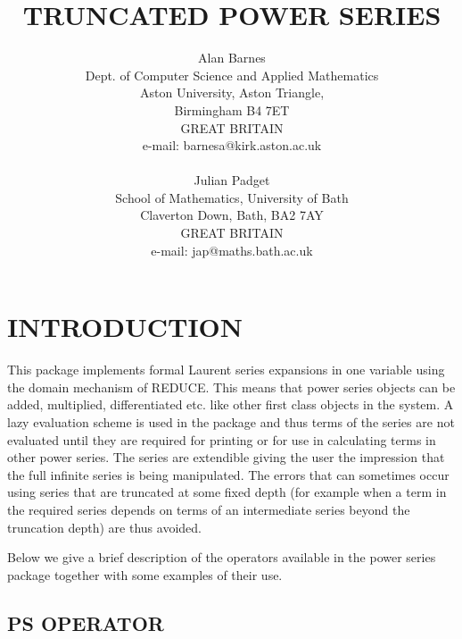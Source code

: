 

\title{TRUNCATED POWER SERIES}
 
\author{Alan Barnes \\
Dept. of Computer Science and Applied Mathematics \\
Aston University, Aston Triangle, \\
Birmingham B4 7ET \\
GREAT BRITAIN \\
e-mail: barnesa@kirk.aston.ac.uk \\
 \\
Julian Padget \\
School of Mathematics, University of Bath \\
Claverton Down, Bath, BA2 7AY \\
GREAT BRITAIN \\
e-mail: jap@maths.bath.ac.uk}

\maketitle

\section*{INTRODUCTION}

This package implements formal Laurent series expansions in one
variable using the domain mechanism of REDUCE. This means that power
series objects can be added, multiplied, differentiated etc. like other
first class objects in the system. A lazy evaluation scheme is used in
the package and thus terms of the series are not evaluated until they
are required for printing or for use in calculating terms in other
power series. The series are extendible giving the user the impression
that the full infinite series is being manipulated.  The errors that
can sometimes occur using series that are truncated at some fixed depth
(for example when a term in the required series depends on terms of an
intermediate series beyond the truncation depth) are thus avoided.

Below we give a brief description of the operators available in the
power series package together with some examples of their use.

\subsection*{PS OPERATOR}

